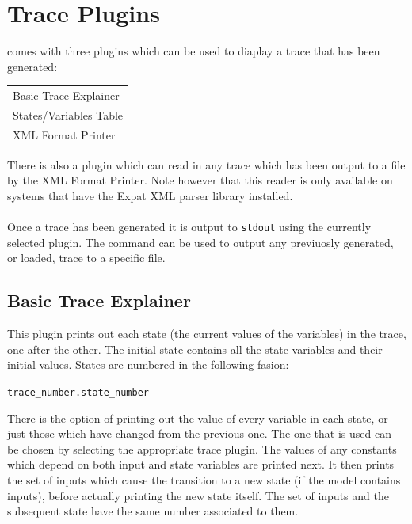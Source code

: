 



\section{Trace Plugins}
\label{Trace Plugins}
\nusmv comes with three plugins which can be used to diaplay a trace
that has been generated:

\begin{center}
\begin{tabular}{l}
Basic Trace Explainer\\
States/Variables Table\\
XML Format Printer\\
\end{tabular}
\end{center}

There is also a plugin which can read in any trace which has been
output to a file by the XML Format Printer. Note however that this
reader is only available on systems that have the Expat XML parser
library installed.\\
\\
Once a trace has been generated it is output to \texttt{stdout} using
the currently selected plugin. The command  can
be used to output any previuosly generated, or loaded, trace to a
specific file.

\subsection{Basic Trace Explainer}
\label{Basic Trace Explainer}

This plugin prints out each state (the current values of the
variables) in the trace, one after the other. The initial state
contains all the state variables and their initial values. States are
numbered in the following fasion:

\begin{center}
\texttt{trace\_number.state\_number}
\end{center}

There is the option of printing out the value of every variable in
each state, or just those which have changed from the previous
one. The one that is used can be chosen by selecting the appropriate
trace plugin. The values of any constants which depend on both input
and state variables are printed next. It then prints the set of inputs
which cause the transition to a new state (if the model contains
inputs), before actually printing the new state itself. The set of
inputs and the subsequent state have the same number associated to
them.

